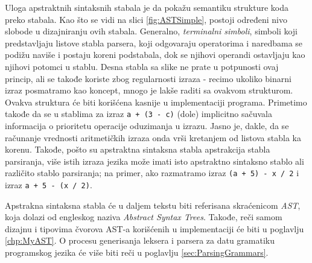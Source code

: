 Uloga apstraktnih sintaksnih stabala je da pokažu semantiku strukture koda preko stabala. Kao što se vidi na slici \ref{fig:ASTSimple}, postoji određeni nivo slobode u dizajniranju ovih stabala. Generalno, \emph{terminalni simboli}, simboli koji predstavljaju listove stabla parsera, koji odgovaraju operatorima i naredbama se podižu naviše i postaju koreni podstabala, dok se njihovi operandi ostavljaju kao njihovi potomci u stablu. Desna stabla sa slike ne prate u potpunosti ovaj princip, ali se takođe koriste zbog regularnosti izraza - recimo ukoliko binarni izraz posmatramo kao koncept, mnogo je lakše raditi sa ovakvom strukturom. Ovakva struktura će biti korišćena kasnije u implementaciji programa. Primetimo takođe da se u stablima za izraz \texttt{a + (3 - c)} (dole) implicitno sačuvala informacija o prioritetu operacije oduzimanja u izrazu. Jasno je, dakle, da se računanje vrednosti aritmetičkih izraza onda vrši kretanjem od listova stabla ka korenu. Takođe, pošto su apstraktna sintaksna stabla apstrakcija stabla parsiranja, više istih izraza jezika može imati isto apstraktno sintaksno stablo ali različito stablo parsiranja; na primer, ako razmatramo izraz \texttt{(a + 5) - x / 2} i izraz \texttt{a + 5 - (x / 2)}.

Apstrakna sintaksna stabla će u daljem tekstu biti referisana skraćenicom \emph{AST}, koja dolazi od engleskog naziva \emph{Abstract Syntax Trees}. Takođe, reči samom dizajnu i tipovima čvorova AST-a korišćenih u implementaciji će biti u poglavlju \ref{chp:MyAST}. O procesu generisanja leksera i parsera za datu gramatiku programskog jezika će više biti reči u poglavlju \ref{sec:ParsingGrammars}.